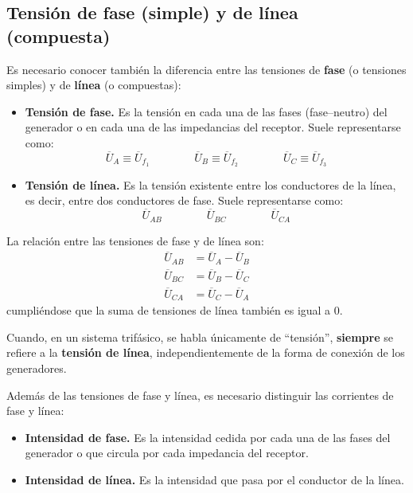 	\subsection{Tensión de fase (simple) y de línea (compuesta)}\label{sec:fase_linea}
	Es necesario conocer también la diferencia entre las tensiones de \textbf{fase} (o tensiones simples) y de \textbf{línea} (o compuestas):
	\begin{itemize}
		\item \textbf{Tensión de fase.} Es la tensión en cada una de las fases (fase--neutro) del generador o en cada una de las impedancias del receptor. Suele representarse como: 
		\begin{equation*}
			\overline{U}_A\equiv \overline{U}_{f_1} \qquad \qquad \overline{U}_B\equiv \overline{U}_{f_2} \qquad \qquad \overline{U}_C \equiv \overline{U}_{f_3} 
		\end{equation*}
		\item \textbf{Tensión de línea.} Es la tensión existente entre los conductores de la línea, es decir, entre dos conductores de fase. Suele representarse como: 
		\begin{equation*}
			\overline{U}_{AB} \qquad \qquad \overline{U}_{BC} \qquad \qquad \overline{U}_{CA} 
		\end{equation*}
	\end{itemize}
	La relación entre las tensiones de fase y de línea son: 
	\begin{align}\label{eq:tensionFL}
		\overline{U}_{AB} &= \overline{U}_A - \overline{U}_B\\
		\overline{U}_{BC} &= \overline{U}_B - \overline{U}_C\\
		\overline{U}_{CA} &= \overline{U}_C - \overline{U}_A
	\end{align}
	cumpliéndose que la suma de tensiones de línea también es igual a 0. 
	\begin{remark}
	    Cuando, en un sistema trifásico, se habla únicamente de ``tensión'', \textbf{siempre} se refiere a la \textbf{tensión de línea}, independientemente de la forma de conexión de los generadores.
	\end{remark}
	
	Además de las tensiones de fase y línea, es necesario distinguir las corrientes de fase y línea:
	\begin{itemize}
		\item \textbf{Intensidad de fase.} Es la intensidad cedida por cada una de las fases del generador o que circula por cada impedancia del receptor. 
		\item \textbf{Intensidad de línea.} Es la intensidad que pasa por el conductor de la línea. 
	\end{itemize}
	

